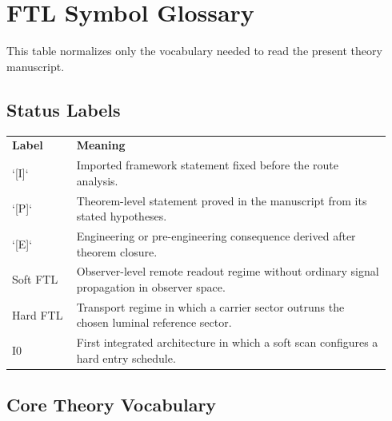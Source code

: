 \section*{FTL Symbol Glossary}

This table normalizes only the vocabulary needed to read the present theory manuscript.

\subsection*{Status Labels}

\begin{tabular}{L{0.16\linewidth}L{0.78\linewidth}}
\textbf{Label} & \textbf{Meaning} \\
`[I]` & Imported framework statement fixed before the route analysis. \\
`[P]` & Theorem-level statement proved in the manuscript from its stated hypotheses. \\
`[E]` & Engineering or pre-engineering consequence derived after theorem closure. \\
Soft FTL & Observer-level remote readout regime without ordinary signal propagation in observer space. \\
Hard FTL & Transport regime in which a carrier sector outruns the chosen luminal reference sector. \\
I0 & First integrated architecture in which a soft scan configures a hard entry schedule. \\
\end{tabular}

\subsection*{Core Theory Vocabulary}

